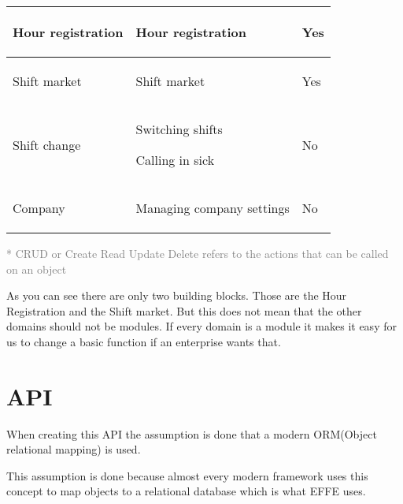 \begin{tabularx}{\linewidth}{|>{}X|>{}X|>{}X|}
    Hour registration
     &
    \begin{compactitem}
        \item Hour registration
    \end{compactitem}
    &
    Yes
    \\ \hline

    Shift market
     &
    \begin{compactitem}
        \item Shift market
    \end{compactitem}
    &
    Yes
    \\ \hline

    Shift change
     &
    \begin{compactitem}
        \item Switching shifts
        \item Calling in sick
    \end{compactitem}
    &
    No
    \\ \hline

    Company
     &
    \begin{compactitem}
        \item Managing company settings
    \end{compactitem}
    &
    No
    \\ \hline
\end{tabularx}

\small{\textcolor{gray}{* CRUD or Create Read Update Delete refers to the actions that can be called on an object}}

As you can see there are only two building blocks. Those are the Hour Registration and the Shift market. But this does not mean that the other domains should not be modules. If every domain is a module it makes it easy for us to change a basic function if an enterprise wants that.

\section{API}
\label{sec:API}

When creating this API the assumption is done that a modern ORM(Object relational mapping) is used.


This assumption is done because almost every modern framework uses this concept to map objects to a relational database which is what EFFE uses.

